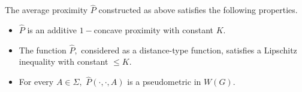 \documentclass[10pt,a4paper]{amsart}
\begin{document}
\begin{lemma}
The average proximity $\widehat P$ constructed as above satisfies the following properties.
\begin{itemize}

    \item[(i)] $\widehat P$ is an additive $1-$concave proximity with constant $K.$
    
    \item[(ii)] The function $\widehat P,$ considered as a distance-type function, satisfies a Lipschitz inequality with constant $\le K.$

    \item[(iii)] For every $A \in \Sigma,$ $\widehat P(\cdot,\cdot,A)$ is a pseudometric in $W(G).$
    
\end{itemize}
\end{lemma}
\end{document}
